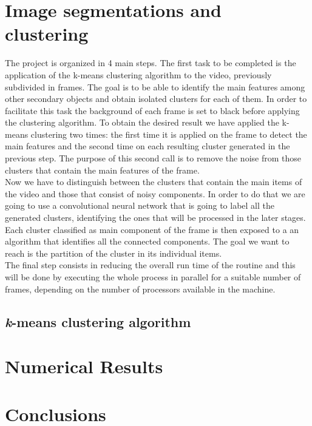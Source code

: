 \documentclass{article}
\begin{document}
{\section{Image segmentations and clustering}
The project is organized in 4 main steps. The first task to be completed is the application of the k-means clustering algorithm to the video, previously subdivided in frames. The goal is to be able to identify the main features among other secondary objects and obtain isolated clusters for each of them. In order to facilitate this task the background of each frame is set to black before applying the clustering algorithm. To obtain the desired result we have applied the k-means clustering two times: the first time it is applied on the frame to detect the main features and the second time on each resulting cluster generated in the previous step. The purpose of this second call is to remove the noise from those clusters that contain the main features of the frame. \\
Now we have to distinguish between the clusters that contain the main items of the video and those that consist of noisy components. In order to do that we are going to use a convolutional neural network that is going to label all the generated clusters, identifying the ones that will be processed in the later stages. \\
Each cluster classified as main component of the frame is then exposed to a an algorithm that identifies all the connected components. The goal we want to reach is the partition of the cluster in its individual items.  \\
The final step consists in reducing the overall run time of the routine and this will be done by executing the whole process in parallel for a suitable number of frames, depending on the number of processors available in the machine.
\subsection{\textit{k}-means clustering algorithm} 


\section{Numerical Results}

\section{Conclusions}

  


}
\end{document}
